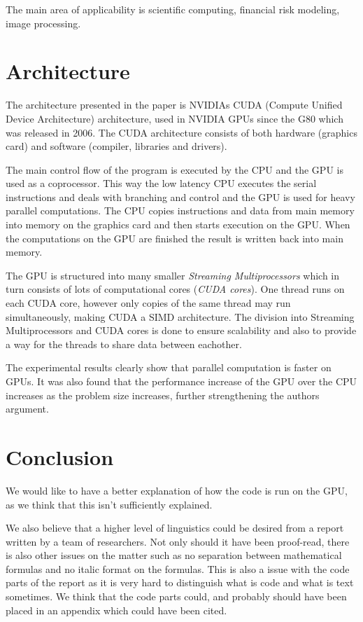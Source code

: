 \documentclass[titlepage, a4paper]{article}
\begin{document}
The main area of applicability is scientific computing, financial risk modeling, image processing.
\section{Architecture}\label{sec:arch}
The architecture presented in the paper is NVIDIAs CUDA (Compute Unified Device Architecture) architecture, used in NVIDIA GPUs since the G80 which was released in 2006. The CUDA architecture consists of both hardware (graphics card) and software (compiler, libraries and drivers).

The main control flow of the program is executed by the CPU and the GPU is used as a coprocessor. This way the low latency CPU executes the serial instructions and deals with branching and control and the GPU is used for heavy parallel computations. The CPU copies instructions and data from main memory into memory on the graphics card and then starts execution on the GPU. When the computations on the GPU are finished the result is written back into main memory.

The GPU is structured into many smaller \textit{Streaming Multiprocessors} which in turn consists of lots of computational cores (\textit{CUDA cores}). One thread runs on each CUDA core, however only copies of the same thread may run simultaneously, making CUDA a SIMD architecture. The division into Streaming Multiprocessors and CUDA cores is done to ensure scalability and also to provide a way for the threads to share data between eachother.

The experimental results clearly show that parallel computation is faster on GPUs. It was also found that the performance increase of the GPU over the CPU increases as the problem size increases, further strengthening the authors argument. 

\section{Conclusion}\label{sec:conclusion}
We would like to have a better explanation of how the code is run on the GPU, as we think that this isn't sufficiently explained.

We also believe that a higher level of linguistics could be desired from a report written by a team of researchers. Not only should it have been proof-read, there is also other issues on the matter such as no separation between mathematical formulas and no italic format on the formulas. This is also a issue with the code parts of the report as it is very hard to distinguish what is code and what is text sometimes. We think that the code parts could, and probably should have been placed in an appendix which could have been cited.
\end{document}
